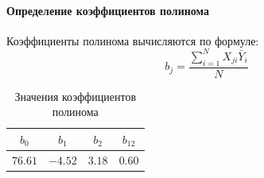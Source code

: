 \documentclass[../../AISTR.tex]{subfiles}
\begin{document}
\paragraph{Определение коэффициентов полинома}
Коэффициенты полинома вычисляются по формуле:
\begin{equation}
	b_j = \frac{\sum\limits_{i=1}^N X_{ji}\bar{Y}_i}{N}
\end{equation}
\begin{table}[H]\label{tab:b}
\centering
\begin{tabular}{|c|c|c|c|}
	\hline
	$b_0$ &$ b_1$ & $b_2$ & $b_{12}$ \\
	\hline
	$76.61$ & $-4.52$ & $3.18$ &$ 0.60$ \\
	\hline
\end{tabular}
\caption{Значения коэффициентов полинома}
\end{table}
\end{document}

